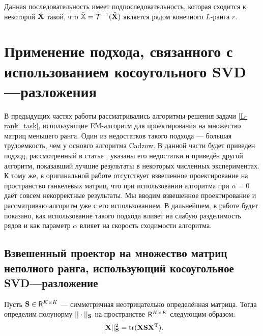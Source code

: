 \documentclass[12pt,a4paper,fleqn,leqno]{article}
\DeclareMathOperator{\tr}{tr}
\begin{document}
Данная последовательность имеет подпоследовательность, которая сходится к некоторой $\tilde{\mathbf{X}}$ такой, что $\tilde{\mathbb{X}} = \mathcal{T}^{-1}(\tilde{\mathbf{X}})$ является рядом конечного $L$-ранга $r$.


\section{Применение подхода, связанного с использованием косоугольного SVD---разложения}
В предыдущих частях работы рассматривались алгоритмы решения задачи \eqref{L-rank_task}, использующие EM-алгоритм для проектирования на множество матриц меньшего ранга. Один из недостатков такого подхода --- большая трудоемкость, чем у основго алгоритма Cadzow. В данной части будет приведен подход, рассмотренный в статье \cite{Gillard2014}, указаны его недостатки и приведён другой алгоритм, показавший лучшие результаты в некоторых численных экспериментах. К тому же, в оригинальной работе \cite{Gillard2014} отсутствует взвешенное проектирование на пространство ганкелевых матриц, что при использовании алгоритма при $\alpha = 0$ даёт совсем некорректные результаты. Мы вводим взвешенное проектирование и рассматриваю алгоритм уже с его использованием. В дальнейшем, в работе будет показано, как использование такого подхода влияет на слабую разделимость рядов и как параметр $\alpha$ влияет на скорость сходимости алгоритма.
\subsection{Взвешенный проектор на множество матриц неполного ранга, использующий косоугольное SVD---разложение}
Пусть $\mathbf{S} \in \mathsf{R}^{K \times K}$ --- симметричная неотрицательно определённая матрица. Тогда определим полунорму $||\cdot||_{\mathbf{S}}$ на пространстве $\mathsf{R}^{K \times K}$ следующим образом:
\begin{equation} \label{S-norm}
||\bfX||^2_{\bfS} = \tr(\bfX \bfS \bfX^\rmT).
\end{equation}
\end{document}
